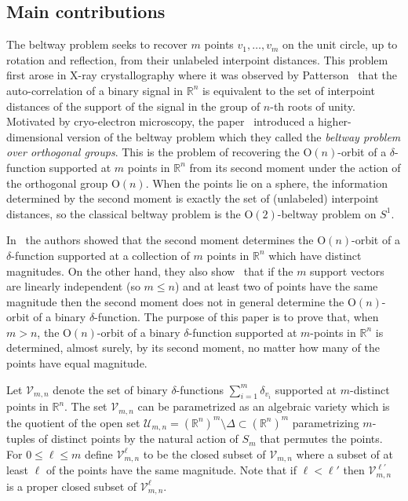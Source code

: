\documentclass{article}
\theoremstyle{definition}
\newcommand{\U}{\mathcal{U}}
\renewcommand{\r}{\mathbb{R}}
\renewcommand{\|}{|}
\newcommand{\V}{\mathcal{V}}
\renewcommand{\O}{\mathrm{O}}
\begin{document}
\subsection{Main contributions}
The beltway problem seeks to recover $m$ points $v_1,\dots, v_m$ on the unit
circle, up to rotation and reflection, from their unlabeled interpoint distances. 
This problem first arose in X-ray crystallography where it was observed by Patterson~\cite{patterson1944ambiguities} that the auto-correlation of a binary signal in $\r^n$ is equivalent to the set of interpoint distances of the support of the signal in the group of $n$-th roots of unity.
Motivated by cryo-electron microscopy, the paper~\cite{bendory2024beltway} introduced a higher-dimensional
version of the beltway problem which they called the {\em beltway problem over orthogonal groups}. This is the problem
of recovering the $\O(n)$-orbit of a $\delta$-function supported at $m$ points in $\r^n$ from its 
second moment under the action
of the orthogonal group $\O(n)$. When the points lie on a sphere, the information determined by the second moment is exactly the set of (unlabeled) interpoint distances, so the classical beltway problem is the $\O(2)$-beltway problem on $S^1$.

In~\cite{bendory2024beltway} the authors
showed that the second moment determines the $\O(n)$-orbit of a $\delta$-function supported at a collection of $m$ points in $\r^n$ which
have distinct magnitudes. On the other hand, they also show~\cite[Proposition 5.1]{bendory2024beltway} that if the $m$ support vectors are linearly independent (so $m  \leq n$) and at least two of points have the same magnitude then the second moment does not in general determine the $\O(n)$-orbit
of a binary $\delta$-function.
The purpose of this paper is to prove that, when $m > n$, the $\O(n)$-orbit of 
a binary $\delta$-function supported at $m$-points in $\r^n$ is determined, almost surely, by its second moment, no matter how many of the points have equal magnitude.


Let $\V_{m,n}$ denote the set of binary
$\delta$-functions $\sum_{i=1}^m \delta_{v_i}$ supported at $m$-distinct points in $\r^n$. The set $\V_{m,n}$
can be parametrized as an algebraic variety which is the quotient of the open set $\U_{m,n} =(\r^n)^m \setminus \Delta \subset (\r^n)^m$
parametrizing $m$-tuples of distinct points by the natural action of $S_m$ that permutes the points.  
For $0 \leq \ell \leq m$ define $\V^{\ell}_{m,n}$ to be the closed subset 
of $\V_{m,n}$ where a subset of at least $\ell$ of the points have the same magnitude. Note that if $\ell < \ell'$ then $\V^{\ell'}_{m,n}$ is a proper closed subset of $\V^{\ell}_{m,n}$.
\end{document}
